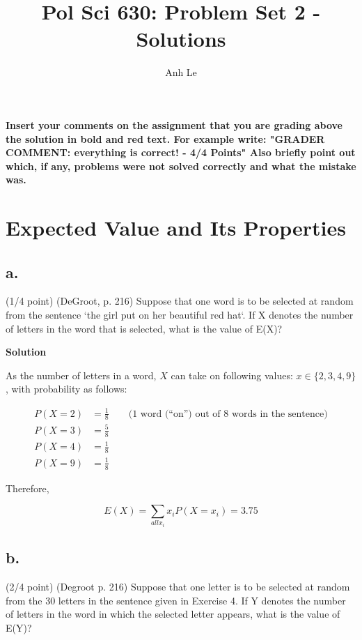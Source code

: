 \documentclass[12pt,letter]{article}\usepackage[]{graphicx}\usepackage[]{color}
\begin{document}
\title{Pol Sci 630: Problem Set 2 - Solutions}
\author{Anh Le}

\maketitle

\textbf{\color{red} Insert your comments on the assignment that you are grading above the solution in bold and red text. For example write: "GRADER COMMENT: everything is correct! - 4/4 Points" Also briefly point out which, if any, problems were not solved correctly and what the mistake was.}

\section{Expected Value and Its Properties}

\subsection*{a.} (1/4 point) (DeGroot, p. 216) Suppose that one word is to be selected at random from the sentence `the girl put on her beautiful red hat`. If X denotes the number of letters in the word that is selected, what is the value of E(X)?

\textbf{Solution}

As the number of letters in a word, $X$ can take on following values: $x \in \{2, 3, 4, 9 \}$, with probability as follows:

\begin{align}
P(X = 2) &= \frac{1}{8} \qquad \text{(1 word (``on'') out of 8 words in the sentence)} \\
P(X = 3) &= \frac{5}{8} \\
P(X = 4) &= \frac{1}{8} \\
P(X = 9) &= \frac{1}{8}
\end{align}

Therefore,

$$E(X) = \sum_{all x_i} x_i P(X = x_i) = 3.75$$

\subsection*{b.} (2/4 point) (Degroot p. 216) Suppose that one letter is to be selected at random from
the 30 letters in the sentence given in Exercise 4. If Y
denotes the number of letters in the word in which the
selected letter appears, what is the value of E(Y)?
\end{document}
